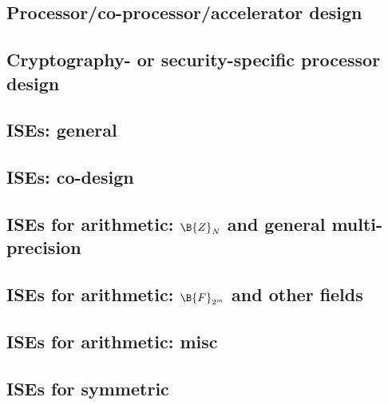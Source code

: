
\subsection*{Processor/co-processor/accelerator design}
\cite{SCARV:Gutmann:00}
\cite{SCARV:WuWeaAus:01}
\cite{SCARV:MTRGS:99}
\cite{SCARV:GGHJPTW:11}
\cite{SCARV:CosLebDev:16}

\subsection*{Cryptography- or security-specific processor design}
\cite{SCARV:FouMoo:05,SCARV:Fournier:07,SCARV:KocSavGro:08,SCARV:TheSisPne:09,SCARV:TilKirSze:10,SCARV:NREAMM:12,SCARV:YumSav:15,SCARV:RagAmbPar:15,SCARV:AweAus:17,SCARV:YHEF:18}

\subsection*{ISEs: general}
\cite{SCARV:BarGioMar:09}
\cite{SCARV:RegIen:16}
\cite{SCARV:FazLopOli:18}

\subsection*{ISEs: co-design}
\cite{SCARV:KLWGSTW:06,SCARV:GIPTV:06}

\subsection*{ISEs for arithmetic: $\B{Z}_{N}$ and general multi-precision}
\cite{SCARV:Gro:02,SCARV:Gro:03,SCARV:GroKam:03:a,SCARV:GAST:05,SCARV:GroTilSze:07}
\subsection*{ISEs for arithmetic: $\B{F}_{2^m}$ and other fields}
\cite{SCARV:GroKam:03:b,SCARV:FisLee:04,SCARV:GroKumPar:04}
\subsection*{ISEs for arithmetic: misc}
\cite{SCARV:GroKam:03,SCARV:GroSav:04,SCARV:VejPagGro:07}

\subsection*{ISEs for symmetric}
\cite{SCARV:MelElb:08,SCARV:MelElb:10}

